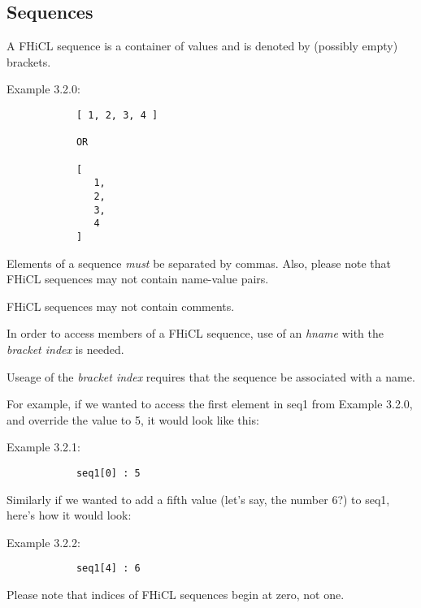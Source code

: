 \documentclass{article}
\begin{document}
	\subsection{Sequences}
		A FHiCL sequence is a container of values
		and is denoted by (possibly empty) brackets.
		\par
		Example 3.2.0:
		\begin{verbatim}
			[ 1, 2, 3, 4 ]
			
			OR

			[
			   1,
			   2,
			   3,
			   4
			]
		\end{verbatim}
		\par
		Elements of a sequence \emph{must} be separated by commas.
		Also, please note that FHiCL sequences may not contain name-value pairs.
		\par
		FHiCL sequences may not contain comments.
		\par
		In order to access members of a FHiCL sequence, use of an \emph{hname}
		with the \emph{bracket index} is needed.
		\par
		Useage of the \emph{bracket index} requires that the sequence be associated with a name.
		\par
		For example, if we wanted to access the first element in seq1 from Example 3.2.0,
		and override the value to 5, it would look like this:
		\par
		Example 3.2.1:
		\begin{verbatim}
			seq1[0] : 5
		\end{verbatim}
		\par
		Similarly if we wanted to add a fifth value (let's say, the number 6?) to seq1,
		here's how it would look:
		\par
		Example 3.2.2:
		\begin{verbatim}
			seq1[4] : 6
		\end{verbatim}
		\par
		Please note that indices of FHiCL sequences begin at zero, not one.
\end{document}
